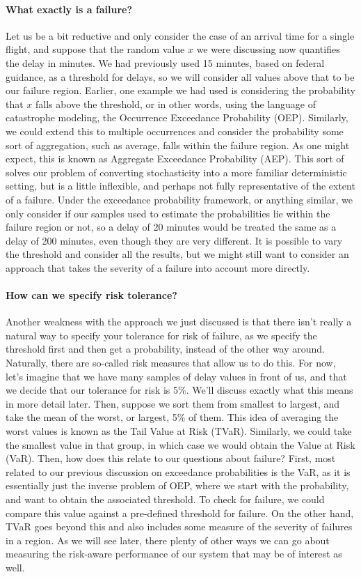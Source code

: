 \paragraph{What exactly is a failure?} Let us be a bit reductive and only consider the case of an arrival time for a single flight, and suppose that the random value $x$ we were discussing now quantifies the delay in minutes. We had previously used 15 minutes, based on federal guidance, as a threshold for delays, so we will consider all values above that to be our failure region. Earlier, one example we had used is considering the probability that $x$ falls above the threshold, or in other words, using the language of catastrophe modeling, the Occurrence Exceedance Probability (OEP). Similarly, we could extend this to multiple occurrences and consider the probability some sort of aggregation, such as average, falls within the failure region. As one might expect, this is known as Aggregate Exceedance Probability (AEP). This sort of solves our problem of converting stochasticity into a more familiar deterministic setting, but is a little inflexible, and perhaps not fully representative of the extent of a failure. Under the exceedance probability framework, or anything similar, we only consider if our samples used to estimate the probabilities lie within the failure region or not, so a delay of 20 minutes would be treated the same as a delay of 200 minutes, even though they are very different. It is possible to vary the threshold and consider all the results, but we might still want to consider an approach that takes the severity of a failure into account more directly. 

\paragraph{How can we specify risk tolerance?} Another weakness with the approach we just discussed is that there isn't really a natural way to specify your tolerance for risk of failure, as we specify the threshold first and then get a probability, instead of the other way around. Naturally, there are so-called risk measures that allow us to do this. For now, let's imagine that we have many samples of delay values in front of us, and that we decide that our tolerance for risk is 5\%. We'll discuss exactly what this means in more detail later. Then, suppose we sort them from smallest to largest, and take the mean of the worst, or largest, 5\% of them. This idea of averaging the worst values is known as the Tail Value at Risk (TVaR). Similarly, we could take the smallest value in that group, in which case we would obtain the Value at Risk (VaR). Then, how does this relate to our questions about failure? First, most related to our previous discussion on exceedance probabilities is the VaR, as it is essentially just the inverse problem of OEP, where we start with the probability, and want to obtain the associated threshold. To check for failure, we could compare this value against a pre-defined threshold for failure. On the other hand, TVaR goes beyond this and also includes some measure of the severity of failures in a region. As we will see later, there plenty of other ways we can go about measuring the risk-aware performance of our system that may be of interest as well.

